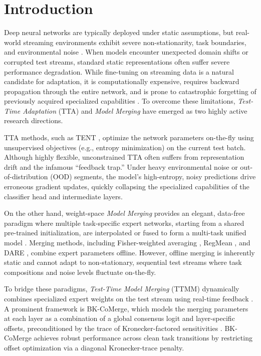 \documentclass{article}
\theoremstyle{plain}
\theoremstyle{definition}
\theoremstyle{remark}
\begin{document}
\section{Introduction}
\label{sec:intro}
Deep neural networks are typically deployed under static assumptions, but real-world streaming environments exhibit severe non-stationarity, task boundaries, and environmental noise \cite{niu2022efficient, wang2022continual}. When models encounter unexpected domain shifts or corrupted test streams, standard static representations often suffer severe performance degradation. While fine-tuning on streaming data is a natural candidate for adaptation, it is computationally expensive, requires backward propagation through the entire network, and is prone to catastrophic forgetting of previously acquired specialized capabilities \cite{niu2023towards}. To overcome these limitations, \emph{Test-Time Adaptation} (TTA) and \emph{Model Merging} have emerged as two highly active research directions.

TTA methods, such as TENT \cite{wang2021tent}, optimize the network parameters on-the-fly using unsupervised objectives (e.g., entropy minimization) on the current test batch. Although highly flexible, unconstrained TTA often suffers from representation drift and the infamous ``feedback trap.'' Under heavy environmental noise or out-of-distribution (OOD) segments, the model's high-entropy, noisy predictions drive erroneous gradient updates, quickly collapsing the specialized capabilities of the classifier head and intermediate layers. 

On the other hand, weight-space \emph{Model Merging} provides an elegant, data-free paradigm where multiple task-specific expert networks, starting from a shared pre-trained initialization, are interpolated or fused to form a multi-task unified model \cite{wortsman2022model, ilharco2023editing, yadav2023ties}. Merging methods, including Fisher-weighted averaging \cite{matena2022merging}, RegMean \cite{jin2023regmean}, and DARE \cite{yu2023language}, combine expert parameters offline. However, offline merging is inherently static and cannot adapt to non-stationary, sequential test streams where task compositions and noise levels fluctuate on-the-fly.

To bridge these paradigms, \emph{Test-Time Model Merging} (TTMM) dynamically combines specialized expert weights on the test stream using real-time feedback \cite{zhao2024dynamic, hubotter2025fisher}. A prominent framework is BK-CoMerge, which models the merging parameters at each layer as a combination of a global consensus logit and layer-specific offsets, preconditioned by the trace of Kronecker-factored sensitivities \cite{martens2015optimizing, luan2026fisher}. BK-CoMerge achieves robust performance across clean task transitions by restricting offset optimization via a diagonal Kronecker-trace penalty. 
\end{document}

